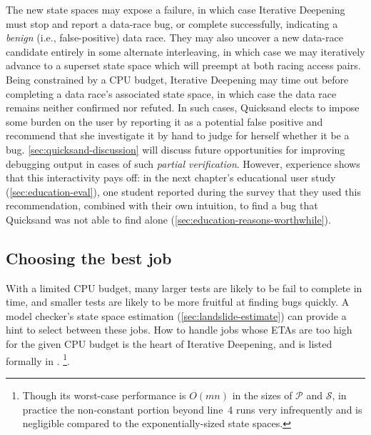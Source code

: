 The new state spaces may expose a failure, in which case Iterative Deepening must stop and report a data-race bug,
or complete successfully, indicating a {\em benign} (i.e., false-positive) data race.
They may also uncover a new data-race candidate entirely in some alternate interleaving,
in which case we may iteratively advance to a superset state space which will preempt at both racing access pairs.
Being constrained by a CPU budget,
Iterative Deepening may time out before completing a data race's associated state space,
in which case the data race remains neither confirmed nor refuted.
In such cases, Quicksand elects to impose some burden on the user
by reporting it as a potential false positive
and recommend that she investigate it by hand to judge for herself whether it be a bug.
\cref{sec:quicksand-discussion} will discuss future opportunities for improving
debugging output in cases of such {\em partial verification}.
However, experience shows that this interactivity pays off:
in the next chapter's educational user study (\cref{sec:education-eval}),
one student reported during the survey that they used this recommendation,
combined with their own intuition,
to find a bug that Quicksand was not able to find alone (\cref{sec:education-reasons-worthwhile}).


\subsection{Choosing the best job}

With a limited CPU budget, many larger tests are likely to be fail to complete in time,
and smaller tests are likely to be more fruitful at finding bugs quickly.
A model checker's state space estimation (\cref{sec:landslide-estimate})
can provide a hint to select between these jobs.
How to handle jobs whose ETAs are too high for the given CPU budget
is the heart of Iterative Deepening,
and is listed formally in .%
\footnote{
Though its worst-case performance is $O(mn)$ in the
sizes of $\mathcal{P}$ and $\mathcal{S}$,
in practice the non-constant portion beyond line~4 runs very infrequently
and is negligible compared to the exponentially-sized state spaces.}.

